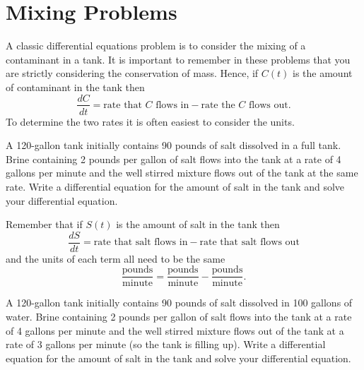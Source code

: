 \section{Mixing Problems}
A classic differential equations problem is to consider the mixing of a contaminant in a
tank.  It is important to remember in these problems that you are strictly considering the
conservation of mass.  Hence, if $C(t)$ is the amount of contaminant in the tank then
\[ \frac{dC}{dt} = \text{rate that $C$ flows in} - \text{rate the $C$ flows out}. \]
To determine the two rates it is often easiest to consider the units.
\begin{problem}
    A 120-gallon tank initially contains 90 pounds of salt dissolved in a full tank.
    Brine containing 2 pounds per gallon of salt flows into the tank at a rate of 4
    gallons per minute and the well stirred mixture flows out of the tank at the same
    rate.  Write a differential equation for the amount of salt in the tank and solve your
    differential equation.

    Remember that if $S(t)$ is the amount of salt in the tank then
    \[ \frac{dS}{dt} = \text{rate that salt flows in} - \text{rate that salt flows out} \]
    and the units of each term all need to be the same
    \[ \frac{\text{pounds}}{\text{minute}} = \frac{\text{pounds}}{\text{minute}} -
        \frac{\text{pounds}}{\text{minute}}. \]
\end{problem}
\solution{
    \[ \frac{dS}{dt} = 4(2) - \frac{4S}{120} \quad \text{with} \quad S(0) = 90. \]
    \[ \frac{dS}{dt} = -\frac{4}{120} \left( S - 8\left( \frac{120}{4} \right) \right) \]
    \[ S(t) = -150 e^{-4t/120} + 240 \]
}

\begin{problem}
    A 120-gallon tank initially contains 90 pounds of salt dissolved in 100 gallons of
    water.  Brine containing 2 pounds per gallon of salt flows into the tank at a rate of
    4 gallons per minute and the well stirred mixture flows out of the tank at a rate of 3
    gallons per minute (so the tank is filling up).  Write a differential equation for the
    amount of salt in the tank and solve your differential equation.
\end{problem}

